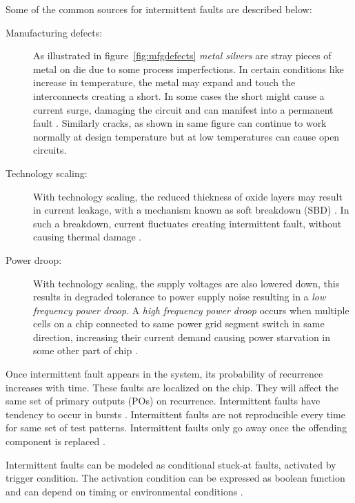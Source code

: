 Some of the common sources for intermittent faults are described below:
\begin{description}
\item[Manufacturing defects:] As illustrated in figure~\ref{fig:mfgdefects} \emph{metal silvers} are stray pieces of metal on die due to some process imperfections. In certain conditions like increase in temperature, the metal may expand and touch the interconnects creating a short. In some cases the short might cause a current surge, damaging the circuit and can manifest into a permanent fault \cite{Hawkins2003}. Similarly cracks, as shown in same figure can continue to work normally at design temperature but at low temperatures can cause open circuits.

\item[Technology scaling:] With technology scaling, the reduced thickness of oxide layers may result in current leakage, with a mechanism known as soft breakdown (SBD) \cite{Stathis2001}. In such a breakdown, current fluctuates creating intermittent fault, without causing thermal damage \cite{Stathis2001, Constantinescu2007a, Constantinescu2007}. 

\item[Power droop:] With technology scaling, the supply voltages are also lowered down, this results in degraded tolerance to power supply noise resulting in a \emph{low frequency power droop}\cite{Polian2007}. A \emph{high frequency power droop} occurs when multiple cells on a chip connected to same power grid segment switch in same direction, increasing their current demand causing power starvation in some other part of chip \cite{Polian2007}. 
\end{description}

Once intermittent fault appears in the system, its probability of recurrence increases with time\cite{Bondavalli2000}. These faults are localized on the chip. They will affect the same set of primary outputs (POs) on recurrence. Intermittent faults have tendency to occur in bursts \cite{Constantinescu2007, Constantinescu2003}. Intermittent faults are not reproducible every time for same set of test patterns. Intermittent faults only go away once the offending component is replaced \cite{Constantinescu2007}.

Intermittent faults can be modeled as conditional stuck-at faults, activated by trigger condition. The activation condition can be expressed as boolean function and can depend on timing or environmental conditions \cite{Holst2009}.


